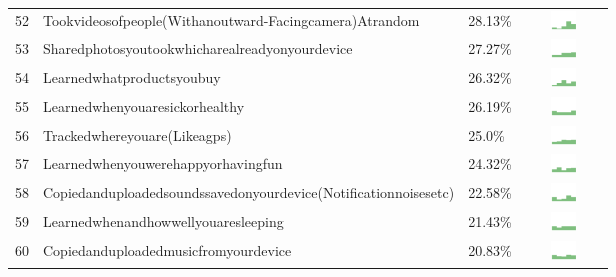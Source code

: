 \documentclass[a4paper,12pt]{article}
\begin{document}
\begin{longtable}{| p{0.5cm} | p{7cm} | p{1cm} | c |}
52 & Tookvideosofpeople(Withanoutward-Facingcamera)Atrandom & 28.13\% & \includegraphics[width = 2cm, height = 0.5cm]{tookvideosofpeople(withanoutward-facingcamera)atrandomAPPSERVER} \\ 
53 & Sharedphotosyoutookwhicharealreadyonyourdevice & 27.27\% & \includegraphics[width = 2cm, height = 0.5cm]{sharedphotosyoutookwhicharealreadyonyourdeviceAPPSERVER} \\ 
54 & Learnedwhatproductsyoubuy & 26.32\% & \includegraphics[width = 2cm, height = 0.5cm]{learnedwhatproductsyoubuyAPPSERVER} \\ 
55 & Learnedwhenyouaresickorhealthy & 26.19\% & \includegraphics[width = 2cm, height = 0.5cm]{learnedwhenyouaresickorhealthyAPPSERVER} \\ 
56 & Trackedwhereyouare(Likeagps) & 25.0\% & \includegraphics[width = 2cm, height = 0.5cm]{trackedwhereyouare(likeaGPS)APPSERVER} \\ 
57 & Learnedwhenyouwerehappyorhavingfun & 24.32\% & \includegraphics[width = 2cm, height = 0.5cm]{learnedwhenyouwerehappyorhavingfunAPPSERVER} \\ 
58 & Copiedanduploadedsoundssavedonyourdevice(Notificationnoisesetc) & 22.58\% & \includegraphics[width = 2cm, height = 0.5cm]{copiedanduploadedsoundssavedonyourdevice(notificationnoisesetc)APPSERVER} \\ 
59 & Learnedwhenandhowwellyouaresleeping & 21.43\% & \includegraphics[width = 2cm, height = 0.5cm]{learnedwhenandhowwellyouaresleepingAPPSERVER} \\ 
60 & Copiedanduploadedmusicfromyourdevice & 20.83\% & \includegraphics[width = 2cm, height = 0.5cm]{copiedanduploadedmusicfromyourdeviceAPPSERVER} \\ 

\end{longtable}
\end{document}
